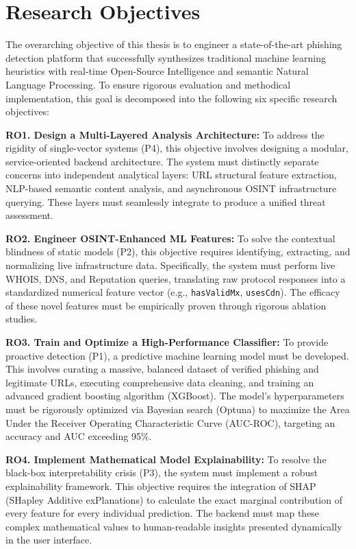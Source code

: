 \section{Research Objectives}\label{research-objectives}

The overarching objective of this thesis is to engineer a
state-of-the-art phishing detection platform that successfully
synthesizes traditional machine learning heuristics with real-time
Open-Source Intelligence and semantic Natural Language Processing. To
ensure rigorous evaluation and methodical implementation, this goal is
decomposed into the following six specific research objectives:

\textbf{RO1. Design a Multi-Layered Analysis Architecture:} To address
the rigidity of single-vector systems (P4), this objective involves
designing a modular, service-oriented backend architecture. The system
must distinctly separate concerns into independent analytical layers:
URL structural feature extraction, NLP-based semantic content analysis,
and asynchronous OSINT infrastructure querying. These layers must
seamlessly integrate to produce a unified threat assessment.

\textbf{RO2. Engineer OSINT-Enhanced ML Features:} To solve the
contextual blindness of static models (P2), this objective requires
identifying, extracting, and normalizing live infrastructure data.
Specifically, the system must perform live WHOIS, DNS, and Reputation
queries, translating raw protocol responses into a standardized
numerical feature vector (e.g., \texttt{hasValidMx}, \texttt{usesCdn}).
The efficacy of these novel features must be empirically proven through
rigorous ablation studies.

\textbf{RO3. Train and Optimize a High-Performance Classifier:} To
provide proactive detection (P1), a predictive machine learning model
must be developed. This involves curating a massive, balanced dataset of
verified phishing and legitimate URLs, executing comprehensive data
cleaning, and training an advanced gradient boosting algorithm
(XGBoost). The model's hyperparameters must be rigorously optimized via
Bayesian search (Optuna) to maximize the Area Under the Receiver
Operating Characteristic Curve (AUC-ROC), targeting an accuracy and AUC
exceeding 95\%.

\textbf{RO4. Implement Mathematical Model Explainability:} To resolve
the black-box interpretability crisis (P3), the system must implement a
robust explainability framework. This objective requires the integration
of SHAP (SHapley Additive exPlanations) to calculate the exact marginal
contribution of every feature for every individual prediction. The
backend must map these complex mathematical values to human-readable
insights presented dynamically in the user interface.

